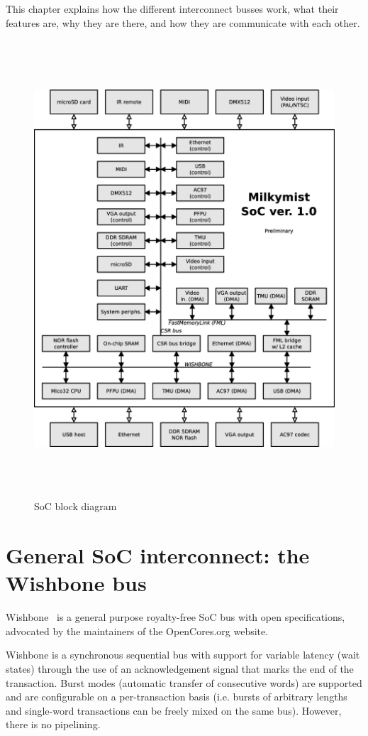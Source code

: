 \documentclass[a4paper,11pt]{kthesis}
\begin{document}
This chapter explains how the different interconnect busses work, what their features are, why they are there, and how they are communicate with each other.

\begin{figure}
\centering
\includegraphics[height=170mm]{soc_architecture.eps}
\caption{SoC block diagram}
\label{fig:block}
\end{figure}

\section{General SoC interconnect: the Wishbone bus}
Wishbone~\cite{wishbone} is a general purpose royalty-free SoC bus with open specifications, advocated by the maintainers of the OpenCores.org website.

Wishbone is a synchronous sequential bus with support for variable latency (wait states) through the use of an acknowledgement signal that marks the end of the transaction. Burst modes (automatic transfer of consecutive words) are supported and are configurable on a per-transaction basis (i.e. bursts of arbitrary lengths and single-word transactions can be freely mixed on the same bus). However, there is no pipelining.
\end{document}
